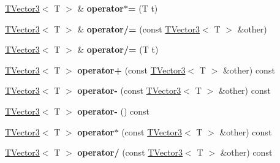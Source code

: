 \begin{DoxyCompactItemize}
\item 
\hyperlink{classAudio_1_1TVector3}{T\+Vector3}$<$ T $>$ \& {\bfseries operator$\ast$=} (T t)\hypertarget{classAudio_1_1TVector3_acb590d712f7dd359410a4bd8c370a657}{}\label{classAudio_1_1TVector3_acb590d712f7dd359410a4bd8c370a657}

\item 
\hyperlink{classAudio_1_1TVector3}{T\+Vector3}$<$ T $>$ \& {\bfseries operator/=} (const \hyperlink{classAudio_1_1TVector3}{T\+Vector3}$<$ T $>$ \&other)\hypertarget{classAudio_1_1TVector3_a1a7e28a77641456e4635bb05a8fbab27}{}\label{classAudio_1_1TVector3_a1a7e28a77641456e4635bb05a8fbab27}

\item 
\hyperlink{classAudio_1_1TVector3}{T\+Vector3}$<$ T $>$ \& {\bfseries operator/=} (T t)\hypertarget{classAudio_1_1TVector3_a90b5d928e451eed31a504a52c7e97e73}{}\label{classAudio_1_1TVector3_a90b5d928e451eed31a504a52c7e97e73}

\item 
\hyperlink{classAudio_1_1TVector3}{T\+Vector3}$<$ T $>$ {\bfseries operator+} (const \hyperlink{classAudio_1_1TVector3}{T\+Vector3}$<$ T $>$ \&other) const \hypertarget{classAudio_1_1TVector3_a74469dc6bc9aeacbcbbbec7ab5bf78c4}{}\label{classAudio_1_1TVector3_a74469dc6bc9aeacbcbbbec7ab5bf78c4}

\item 
\hyperlink{classAudio_1_1TVector3}{T\+Vector3}$<$ T $>$ {\bfseries operator-\/} (const \hyperlink{classAudio_1_1TVector3}{T\+Vector3}$<$ T $>$ \&other) const \hypertarget{classAudio_1_1TVector3_a976fad023d7d7014a7362d6a8919bc65}{}\label{classAudio_1_1TVector3_a976fad023d7d7014a7362d6a8919bc65}

\item 
\hyperlink{classAudio_1_1TVector3}{T\+Vector3}$<$ T $>$ {\bfseries operator-\/} () const \hypertarget{classAudio_1_1TVector3_a9cb8b79d15621cf366a9090af62ac64c}{}\label{classAudio_1_1TVector3_a9cb8b79d15621cf366a9090af62ac64c}

\item 
\hyperlink{classAudio_1_1TVector3}{T\+Vector3}$<$ T $>$ {\bfseries operator$\ast$} (const \hyperlink{classAudio_1_1TVector3}{T\+Vector3}$<$ T $>$ \&other) const \hypertarget{classAudio_1_1TVector3_aaef4dca8f06b978ee454a00127bbf23e}{}\label{classAudio_1_1TVector3_aaef4dca8f06b978ee454a00127bbf23e}

\item 
\hyperlink{classAudio_1_1TVector3}{T\+Vector3}$<$ T $>$ {\bfseries operator/} (const \hyperlink{classAudio_1_1TVector3}{T\+Vector3}$<$ T $>$ \&other) const \hypertarget{classAudio_1_1TVector3_a34815a5bcaf25ee9c3a2f60fe6f6fbc8}{}\label{classAudio_1_1TVector3_a34815a5bcaf25ee9c3a2f60fe6f6fbc8}


\end{DoxyCompactItemize}

